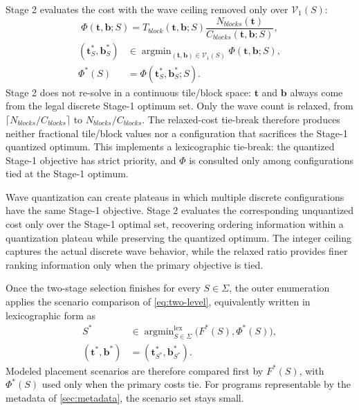 \documentclass[acmsmall,review,anonymous,screen]{acmart}
\newcommand{\tvec}{\mathbf{t}}
\begin{document}
Stage 2 evaluates the cost with the wave ceiling removed only over \(\mathcal{V}_1(S)\):
\begin{equation}
\Phi(\tvec,\mathbf{b};S)
=T_{\mathit{block}}(\tvec,\mathbf{b};S)
 \frac{N_{\mathit{blocks}}(\tvec)}{C_{\mathit{blocks}}(\tvec,\mathbf{b};S)},
\label{eq:relaxed-cost}
\end{equation}
\begin{equation}
\begin{aligned}
(\tvec_S^*,\mathbf{b}_S^*)
&\in \mathop{\arg\min}_{(\tvec,\mathbf{b})\in\mathcal{V}_1(S)}
 \Phi(\tvec,\mathbf{b};S),\\
\Phi^*(S)
&=\Phi(\tvec_S^*,\mathbf{b}_S^*;S).
\end{aligned}
\label{eq:stage-two}
\end{equation}
Stage 2 does not re-solve in a continuous tile/block space: \(\tvec\) and \(\mathbf{b}\) always come from the legal discrete Stage-1 optimum set. Only the wave count is relaxed, from \(\lceil N_{\mathit{blocks}}/C_{\mathit{blocks}}\rceil\) to \(N_{\mathit{blocks}}/C_{\mathit{blocks}}\). The relaxed-cost tie-break therefore produces neither fractional tile/block values nor a configuration that sacrifices the Stage-1 quantized optimum. This implements a lexicographic tie-break: the quantized Stage-1 objective has strict priority, and \(\Phi\) is consulted only among configurations tied at the Stage-1 optimum.

Wave quantization can create plateaus in which multiple discrete configurations have the same Stage-1 objective. Stage 2 evaluates the corresponding unquantized cost only over the Stage-1 optimal set, recovering ordering information within a quantization plateau while preserving the quantized optimum. The integer ceiling captures the actual discrete wave behavior, while the relaxed ratio provides finer ranking information only when the primary objective is tied.

Once the two-stage selection finishes for every \(S\in\Sigma\), the outer enumeration applies the scenario comparison of \autoref{eq:two-level}, equivalently written in lexicographic form as
\begin{equation}
\begin{aligned}
S^*
&\in \mathop{\arg\min}_{S\in\Sigma}^{\mathrm{lex}}
   \bigl(F^*(S),\Phi^*(S)\bigr),\\
(\tvec^*,\mathbf{b}^*)
&=(\tvec_{S^*}^*,\mathbf{b}_{S^*}^*).
\end{aligned}
\label{eq:outer-selection}
\end{equation}
Modeled placement scenarios are therefore compared first by \(F^*(S)\), with \(\Phi^*(S)\) used only when the primary costs tie. For programs representable by the metadata of \autoref{sec:metadata}, the scenario set stays small.
\end{document}
